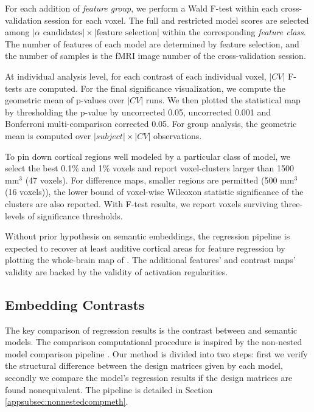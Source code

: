 For each addition of \emph{feature group}, we perform a Wald F-test within each cross-validation session for each voxel. The full and restricted model scores are selected among \( \lvert \alpha \text{ candidates} \rvert \times \lvert \text{feature selection} \rvert \) within the corresponding \emph{feature class}. The number of features of each model are determined by feature selection, and the number of samples is the fMRI image number of the cross-validation session.

At individual analysis level, for each contrast of each individual voxel, \( \lvert CV \rvert \) F-tests are computed. For the final significance visualization, we compute the geometric mean of p-values over \(\lvert CV \rvert \) runs. We then plotted the statistical map by thresholding the p-value by uncorrected 0.05, uncorrected 0.001 and Bonferroni multi-comparison corrected 0.05. For group analysis, the geometric mean is computed over \(\lvert subject \rvert \times \lvert CV \rvert \) observations. 

To pin down cortical regions well modeled by a particular class of model, we select the best 0.1\% and 1\% voxels and report voxel-clusters larger than 1500 \(\text{mm}^3\) (47 voxels). For  difference maps, smaller regions are permitted (500 \(\text{mm}^3\) (16 voxels)), the lower bound of voxel-wise Wilcoxon statistic significance of the clusters are also reported. With F-test results, we report voxels surviving three-levels of significance thresholds.

Without prior hypothesis on semantic embeddings, the regression pipeline is expected to recover at least auditive cortical areas for  feature regression by plotting the whole-brain map of . The additional features' and contrast maps' validity are backed by the validity of  activation regularities.

\subsection{Embedding Contrasts}
The key comparison of regression results is the contrast between  and  semantic models. The comparison computational procedure is inspired by the non-nested model comparison pipeline \parencite{merkleTestingNonnestedStructural2016}. Our method is divided into two steps: first we verify the structural difference between the design matrices given by each model, secondly we compare the model's regression results if the design matrices are found nonequivalent. The pipeline is detailed in Section \ref{appsubsec:nonnestedcompmeth}.

